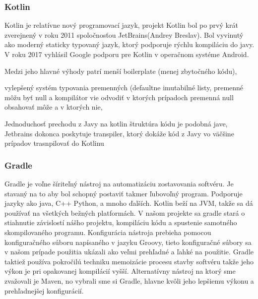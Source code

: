   

\subsubsection{Kotlin} 

\noindent Kotlin je relatívne nový programovací jazyk, projekt Kotlin bol po prvý krát zverejnený v roku 2011 spoločnosťou JetBrains(Andrey Breslav). Bol vyvinutý ako moderný staticky typovaný jazyk, ktorý podporuje rýchlu kompiláciu do javy. V roku 2017 vyhlásil Google podporu pre Kotlin v operačnom systéme Android.  

  

Medzi jeho hlavné výhody patrí menší boilerplate (menej zbytočného kódu),  

  

vylepšený systém typovania premenných (defaultne imutabilné listy, premenné môžu byť null a kompilátor vie odvodiť v ktorých prípadoch premenná null obsahovať môže a v ktorých nie,  

  

Jednoduchosť prechodu z Javy na kotlin štruktúra kódu je podobná jave, Jetbrains dokonca poskytuje transpiler, ktorý dokáže kód z Javy vo väčšine prípadov trasnpilovať do Kotlinu 


  

\subsubsection{Gradle} 

Gradle je voľne šíriteľný nástroj na automatizáciu zostavovania softvéru. Je stavaný na to aby bol schopný postaviť takmer ľubovoľný program. Podporuje jazyky ako java, C++ Python, a mnoho ďalších. Kotlin beží na JVM, takže sa dá používať na všetkých bežných platformách. V našom projekte sa gradle stará o stiahnutie závislostí nášho projektu, kompiláciu kódu a spustenie samotného skompilovaného programu. Konfigurácia nástroja prebieha pomocou konfiguračného súboru napísaného v jazyku Groovy, tieto konfiguračné  súbory sa v našom prípade použitia ukázali ako veľmi prehľadné a ľahké na použitie. Gradle taktiež používa pokročilú techniku memoizácie procesu stavby softvéru takže jeho výkon je pri opakovanej kompilácií vyšší. Alternatívny nástroj na ktorý sme zvažovali je Maven, no vybrali sme si Gradle, hlavne kvôli jeho lepšiemu výkonu a prehľadnejšej konfigurácií. 

  

